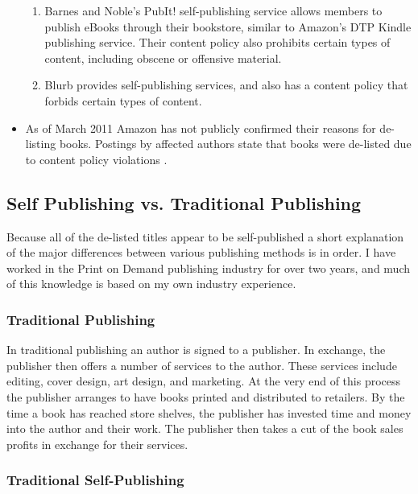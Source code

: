 \documentclass[11pt]{article}
\begin{document}
\begin{multicols}{2}
\begin{itemize}
\begin{enumerate}
   \item Barnes and Noble's PubIt! self-publishing service allows members to publish eBooks through their bookstore, similar to Amazon's DTP Kindle publishing service.  Their content policy also prohibits certain types of content, including obscene or offensive material.  \cite[Select Service Policies, then Content Policy]{PubItContentPolicy}

   \item Blurb provides self-publishing services, and also has a content policy that forbids certain types of content. \cite{BlurbEULA}
   \end{enumerate}

\item As of March 2011 Amazon has not publicly confirmed their reasons for de-listing books. Postings by affected authors state that books were de-listed due to content policy violations \cite{KittSelfPubRevolution}.

\end{itemize}

\subsection{Self Publishing vs. Traditional Publishing}

Because all of the de-listed titles appear to be self-published a short explanation of the major differences between various publishing methods is in order.  I have worked in the Print on Demand publishing industry for over two years, and much of this knowledge is based on my own industry experience.

\subsubsection{Traditional Publishing}

In traditional publishing an author is signed to a publisher.  In exchange, the publisher then offers a number of services to the author.  These services include editing, cover design, art design, and marketing. \cite{WhatPublisherDoes}  At the very end of this process the publisher arranges to have books printed and distributed to retailers. \cite{WhatPublisherDoes}  By the time a book has reached store shelves, the publisher has invested time and money into the author and their work.  The publisher then takes a cut of the book sales profits in exchange for their services.

\subsubsection{Traditional Self-Publishing}


\end{multicols}
\end{document}
